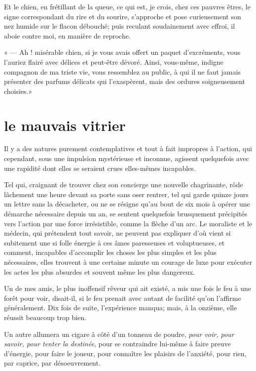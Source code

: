 Et le chien, en frétillant de la queue, ce qui est, je crois, chez ces
pauvres êtres, le signe correspondant du rire et du sourire,
s’approche et pose curieusement son nez humide sur le
flacon débouché; puis reculant soudainement avec effroi, il aboie
contre moi, en manière de reproche.

« --- Ah ! misérable chien, si je vous avais offert un paquet
d’excréments, vous l’auriez flairé
avec délices et peut{}-être dévoré. Ainsi, vous{}-même, indigne
compagnon de ma triste vie, vous ressemblez au public, à qui il ne faut
jamais présenter des parfums délicats qui
l’exaspèrent, mais des ordures soigneusement choisies.»


\quebra\section[Le mauvais vitrier]{le mauvais vitrier}

Il y a des natures purement contemplatives et tout à fait impropres à
l’action, qui cependant, sous une impulsion
mystérieuse et inconnue, agissent quelquefois avec une rapidité dont
elles se seraient crues elles{}-mêmes incapables.

Tel qui, craignant de trouver chez son concierge une nouvelle
chagrinante, rôde lâchement une heure devant sa porte sans oser
rentrer, tel qui garde quinze jours un lettre sans la décacheter, ou ne
se résigne qu’au bout de six mois à opérer une
démarche nécessaire depuis un an, se sentent quelquefois brusquement
précipités vers l’action par une force irrésistible,
comme la flèche d’un arc. Le moraliste et le médecin,
qui prétendent tout savoir, ne peuvent pas expliquer
d’où vient si subitement une si folle énergie à ces
âmes paresseuses et voluptueuses, et comment, incapables
d’accomplir les choses les plus simples et les plus
nécessaires, elles trouvent à une certaine minute un courage de luxe
pour exécuter les actes les plus absurdes et souvent même les plus
dangereux.

Un de mes amis, le plus inoffensif rêveur qui ait existé, a mis une fois
le feu à une forêt pour voir, disait{}-il, si le feu prenait avec
autant de facilité qu’on l’affirme
généralement. Dix fois de suite, l’expérience manqua;
mais, à la onzième, elle réussit beaucoup trop bien.

Un autre allumera un cigare à côté d’un tonneau de
poudre, \textit{pour voir, pour savoir, pour tenter la destinée}, pour se
contraindre lui{}-même à faire preuve d’énergie, pour
faire le joueur, pour connaître les plaisirs de
l’anxiété, pour rien, par caprice, par désoeuvrement.

